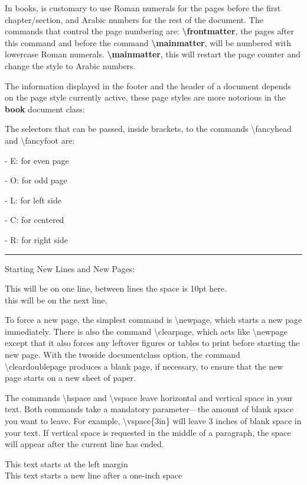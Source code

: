 \documentclass[a4paper,11pt,UTF8,openright]{book}
\begin{document}
In books, is customary to use Roman numerals for the pages before the first chapter/section, and Arabic numbers for the rest of the document. The commands that control the page numbering are: \textbf{\textbackslash frontmatter}, the pages after this command and before the command \textbf{\textbackslash mainmatter}, will be numbered with lowercase Roman numerals. \textbf{\textbackslash mainmatter}, this will restart the page counter and change the style to Arabic numbers.

The information displayed in the footer and the header of a document depends on the page style currently active, these page styles are more notorious in the \textbf{book} document class:

The selectors that can be passed, inside brackets, to the commands \textbackslash fancyhead and \textbackslash fancyfoot are:

- E: for even page

- O: for odd page

- L: for left side

- C: for centered

- R: for right side

\vskip 0.05in
\rule{\textwidth}{0.5pt}
\vskip 0.05in

Starting New Lines and New Pages:

This will be on one line, between lines the space is 10pt here. \\[10pt] this will be on the next line. 

To force a new page, the simplest command is \textbackslash newpage, which starts a new page immediately. There is also the command \textbackslash clearpage, which acts like \textbackslash newpage except that it also forces any leftover figures or tables to print before starting the new page. With the twoside documentclass option, the command \textbackslash cleardoublepage produces a blank page, if necessary, to ensure that the new page starts on a new sheet of paper.

The commands \textbackslash hspace and \textbackslash vspace leave horizontal and vertical space in your text. Both commands take a mandatory parameter—the amount of blank space you want to leave. For example, \textbackslash vspace\{3in\} will leave 3 inches of blank space in your text. If vertical space is requested in the middle of a paragraph, the space will appear after the current line has ended.

This text starts at the left margin\\
\hspace*{1in}This text starts a new line after a one-inch space
\end{document}
